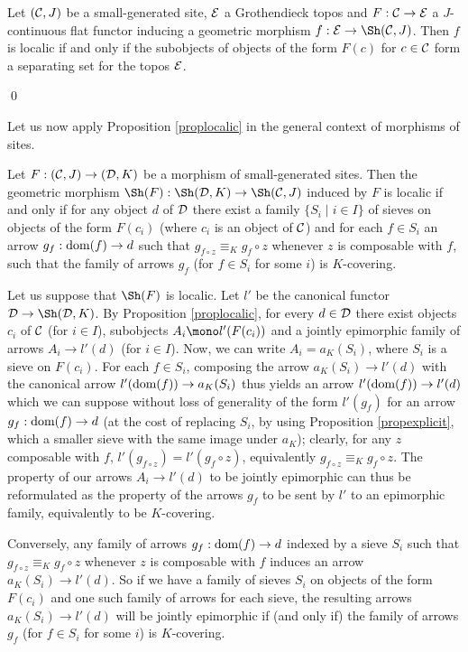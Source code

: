 \documentclass[a4paper,12pt]{article}
\begin{document}
\begin{proposition}
	Let $({\cal C}, J)$ be a small-generated site, $\cal E$ a Grothendieck topos and $F:{\cal C}\to {\cal E}$ a $J$-continuous flat functor inducing a geometric morphism $f:{\cal E}\to \Sh({\cal C}, J)$. Then $f$ is localic if and only if the subobjects of objects of the form $F(c)$ for $c\in {\cal C}$ form a separating set for the topos $\cal E$.
\end{proposition}\qed

Let us now apply Proposition \ref{proplocalic} in the general context of morphisms of sites.

\begin{proposition}\label{proplocalicsites}
	Let $F:({\cal C}, J)\to ({\cal D}, K)$ be a morphism of small-generated sites. Then the geometric morphism $\Sh(F):\Sh({\cal D}, K) \to \Sh({\cal C}, J)$ induced by $F$ is localic if and only if for any object $d$ of $\cal D$ there exist a family $\{S_{i} \mid i\in I\}$ of sieves on objects of the form $F(c_{i})$ (where $c_{i}$ is an object of $\cal C$) and for each $f\in S_{i}$ an arrow $g_{f}:\textup{dom}(f)\to d$ such that $g_{f\circ z}\equiv_{K} g_{f}\circ z$ whenever $z$ is composable with $f$, such that the family of arrows $g_{f}$ (for $f\in S_{i}$ for some $i$) is $K$-covering.  
\end{proposition}

\begin{proofs}
Let us suppose that $\Sh(F)$ is localic. Let $l'$ be the canonical functor ${\cal D}\to \Sh({\cal D}, K)$. By Proposition \ref{proplocalic}, for every $d\in {\cal D}$ there exist objects $c_{i}$ of $\cal C$ (for $i\in I$), subobjects $A_{i}\mono l'(F(c_i))$ and a jointly epimorphic family of arrows $A_{i}\to l'(d)$ (for $i\in I$). Now, we can write $A_{i}=a_{K}(S_{i})$, where $S_i$ is a sieve on $F(c_i)$. For each $f\in S_{i}$, composing the arrow $a_{K}(S_{i})\to l'(d)$ with the canonical arrow $l'(\textup{dom}(f))\to a_{K}(S_{i})$ thus yields an arrow $l'(\textup{dom}(f))\to l'(d)$ which we can suppose without loss of generality of the form $l'(g_{f})$ for an arrow $g_{f}:\textup{dom}(f)\to d$ (at the cost of replacing $S_{i}$, by using Proposition \ref{propexplicit}, which a smaller sieve with the same image under $a_{K}$); clearly, for any $z$ composable with $f$, $l'(g_{f\circ z})=l'(g_{f}\circ z)$, equivalently $g_{f\circ z}\equiv_{K} g_{f}\circ z$. The property of our arrows $A_{i}\to l'(d)$ to be jointly epimorphic can thus be reformulated as the property of the arrows $g_{f}$ to be sent by $l'$ to an epimorphic family, equivalently to be $K$-covering.

Conversely, any family of arrows $g_{f}:\textup{dom}(f)\to d$ indexed by a sieve $S_{i}$ such that $g_{f\circ z}\equiv_{K} g_{f}\circ z$ whenever $z$ is composable with $f$ induces an arrow $a_K(S_i)\to l'(d)$. So if we have a family of sieves $S_{i}$ on objects of the form $F(c_i)$ and one such family of arrows for each sieve, the resulting arrows $a_K(S_i)\to l'(d)$ will be jointly epimorphic if (and only if) the family of arrows $g_{f}$ (for $f\in S_{i}$ for some $i$) is $K$-covering.    	
\end{proofs}
\end{document}
